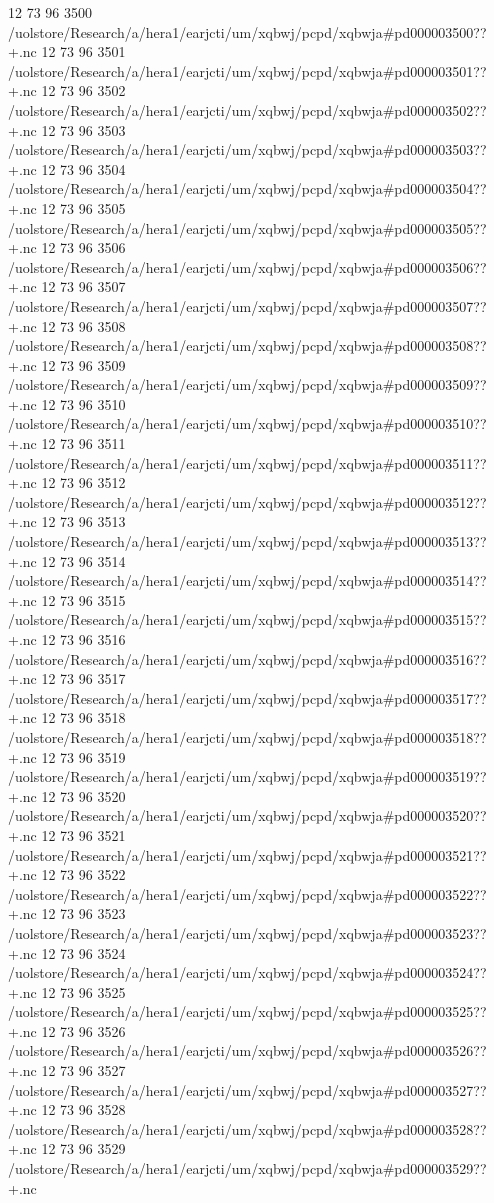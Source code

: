 12 73 96
3500
/uolstore/Research/a/hera1/earjcti/um/xqbwj/pcpd/xqbwja#pd000003500??+.nc
12 73 96
3501
/uolstore/Research/a/hera1/earjcti/um/xqbwj/pcpd/xqbwja#pd000003501??+.nc
12 73 96
3502
/uolstore/Research/a/hera1/earjcti/um/xqbwj/pcpd/xqbwja#pd000003502??+.nc
12 73 96
3503
/uolstore/Research/a/hera1/earjcti/um/xqbwj/pcpd/xqbwja#pd000003503??+.nc
12 73 96
3504
/uolstore/Research/a/hera1/earjcti/um/xqbwj/pcpd/xqbwja#pd000003504??+.nc
12 73 96
3505
/uolstore/Research/a/hera1/earjcti/um/xqbwj/pcpd/xqbwja#pd000003505??+.nc
12 73 96
3506
/uolstore/Research/a/hera1/earjcti/um/xqbwj/pcpd/xqbwja#pd000003506??+.nc
12 73 96
3507
/uolstore/Research/a/hera1/earjcti/um/xqbwj/pcpd/xqbwja#pd000003507??+.nc
12 73 96
3508
/uolstore/Research/a/hera1/earjcti/um/xqbwj/pcpd/xqbwja#pd000003508??+.nc
12 73 96
3509
/uolstore/Research/a/hera1/earjcti/um/xqbwj/pcpd/xqbwja#pd000003509??+.nc
12 73 96
3510
/uolstore/Research/a/hera1/earjcti/um/xqbwj/pcpd/xqbwja#pd000003510??+.nc
12 73 96
3511
/uolstore/Research/a/hera1/earjcti/um/xqbwj/pcpd/xqbwja#pd000003511??+.nc
12 73 96
3512
/uolstore/Research/a/hera1/earjcti/um/xqbwj/pcpd/xqbwja#pd000003512??+.nc
12 73 96
3513
/uolstore/Research/a/hera1/earjcti/um/xqbwj/pcpd/xqbwja#pd000003513??+.nc
12 73 96
3514
/uolstore/Research/a/hera1/earjcti/um/xqbwj/pcpd/xqbwja#pd000003514??+.nc
12 73 96
3515
/uolstore/Research/a/hera1/earjcti/um/xqbwj/pcpd/xqbwja#pd000003515??+.nc
12 73 96
3516
/uolstore/Research/a/hera1/earjcti/um/xqbwj/pcpd/xqbwja#pd000003516??+.nc
12 73 96
3517
/uolstore/Research/a/hera1/earjcti/um/xqbwj/pcpd/xqbwja#pd000003517??+.nc
12 73 96
3518
/uolstore/Research/a/hera1/earjcti/um/xqbwj/pcpd/xqbwja#pd000003518??+.nc
12 73 96
3519
/uolstore/Research/a/hera1/earjcti/um/xqbwj/pcpd/xqbwja#pd000003519??+.nc
12 73 96
3520
/uolstore/Research/a/hera1/earjcti/um/xqbwj/pcpd/xqbwja#pd000003520??+.nc
12 73 96
3521
/uolstore/Research/a/hera1/earjcti/um/xqbwj/pcpd/xqbwja#pd000003521??+.nc
12 73 96
3522
/uolstore/Research/a/hera1/earjcti/um/xqbwj/pcpd/xqbwja#pd000003522??+.nc
12 73 96
3523
/uolstore/Research/a/hera1/earjcti/um/xqbwj/pcpd/xqbwja#pd000003523??+.nc
12 73 96
3524
/uolstore/Research/a/hera1/earjcti/um/xqbwj/pcpd/xqbwja#pd000003524??+.nc
12 73 96
3525
/uolstore/Research/a/hera1/earjcti/um/xqbwj/pcpd/xqbwja#pd000003525??+.nc
12 73 96
3526
/uolstore/Research/a/hera1/earjcti/um/xqbwj/pcpd/xqbwja#pd000003526??+.nc
12 73 96
3527
/uolstore/Research/a/hera1/earjcti/um/xqbwj/pcpd/xqbwja#pd000003527??+.nc
12 73 96
3528
/uolstore/Research/a/hera1/earjcti/um/xqbwj/pcpd/xqbwja#pd000003528??+.nc
12 73 96
3529
/uolstore/Research/a/hera1/earjcti/um/xqbwj/pcpd/xqbwja#pd000003529??+.nc

